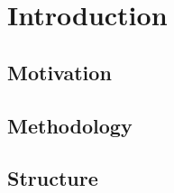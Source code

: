 \chapter{Introduction}
\label{chp:introduction} 


\section{Motivation}

\section{Methodology}

\section{Structure}